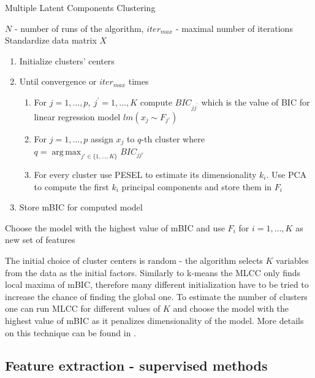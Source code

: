 \documentclass[shortabstract, english, mgr]{iithesis}
\DeclareMathOperator*{\argmax}{arg\,max}
\begin{document}
\begin{algorithm}[H]
\caption{Multiple Latent Components Clustering}
\label{alg:mlcc}          
\begin{algorithmic}                    
    \REQUIRE $N$ - number of runs of the algorithm, $iter_{max}$ - maximal number of iterations
    \STATE Standardize data matrix $X$
        \STATE 
        	\begin{enumerate}
        	\item Initialize clusters' centers
        	\item Until convergence or $iter_{max}$ times
        	\begin{enumerate}
        	\item For $j=1, \ldots, p, \ j^{\prime} = 1, \ldots, K$ compute $BIC_{jj^{\prime}}$ which is the value of BIC for linear regression model $lm(x_j \sim F_{j'})$
        	\item For $j=1, \ldots, p$ assign $x_j$ to $q$-th cluster where $q = \argmax_{j' \in \{1,\ldots, K\}} BIC_{jj'} $
        	\item For every cluster use PESEL to estimate its dimensionality $k_i$. Use PCA to compute the first $k_i$ principal components and store them in $F_i$
        	\end{enumerate}
        	\item Store mBIC for computed model
        	\end{enumerate}
        	\ENDFOR
        \STATE Choose the model with the highest value of mBIC and use $F_i$ for $i=1, \ldots, K$ as new set of features
\end{algorithmic}
\end{algorithm}

The initial choice of cluster centers is random - the algorithm selects $K$ variables from the data as the initial factors. Similarly to k-means the MLCC only finds local maxima of mBIC, therefore many different initialization have to be tried to increase the chance of finding the global one. To estimate the number of clusters one can run MLCC for different values of $K$ and choose the model with the highest value of mBIC as it penalizes dimensionality of the model. More details on this technique can be found in \cite{MLCC}.

\subsection{Feature extraction - supervised methods}
\end{document}
